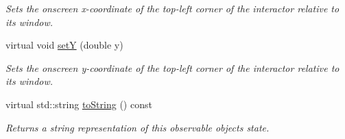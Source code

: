 \begin{DoxyCompactItemize}
\begin{DoxyCompactList}\small\item\em Sets the onscreen x-\/coordinate of the top-\/left corner of the interactor relative to its window. \end{DoxyCompactList}\item 
virtual void \mbox{\hyperlink{classGInteractor_a7d57e2a5c35d27feb58fd498a3cf82b9}{setY}} (double y)
\begin{DoxyCompactList}\small\item\em Sets the onscreen y-\/coordinate of the top-\/left corner of the interactor relative to its window. \end{DoxyCompactList}\item 
virtual std\+::string \mbox{\hyperlink{classGObservable_a1fe5121d6528fdea3f243321b3fa3a49}{to\+String}} () const
\begin{DoxyCompactList}\small\item\em Returns a string representation of this observable object\textquotesingle{}s state. \end{DoxyCompactList}\end{DoxyCompactItemize}
